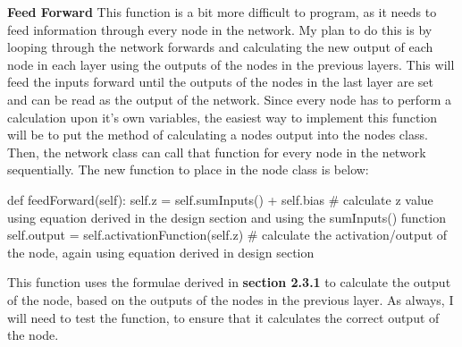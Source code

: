 \documentclass{report}
\begin{document}
\noindent\textbf{Feed Forward}
\newline
\newline
This function is a bit more difficult to program, as it needs to feed information through every node in the network. My plan to do this is by looping through the network forwards and calculating the new output of each node in each layer using the outputs of the nodes in the previous layers. This will feed the inputs forward until the outputs of the nodes in the last layer are set and can be read as the output of the network.
\newline
Since every node has to perform a calculation upon it's own variables, the easiest way to implement this function will be to put the method of calculating a nodes output into the nodes class. Then, the network class can call that function for every node in the network sequentially.
\newline
The new function to place in the node class is below:
\begin{python}
def feedForward(self):
    self.z = self.sumInputs() + self.bias # calculate z value using equation derived in the design section and using the sumInputs() function
    self.output = self.activationFunction(self.z) # calculate the activation/output of the node, again using equation derived in design section
\end{python}
This function uses the formulae derived in \textbf{section 2.3.1} to calculate the output of the node, based on the outputs of the nodes in the previous layer. As always, I will need to test the function, to ensure that it calculates the correct output of the node.
\end{document}

